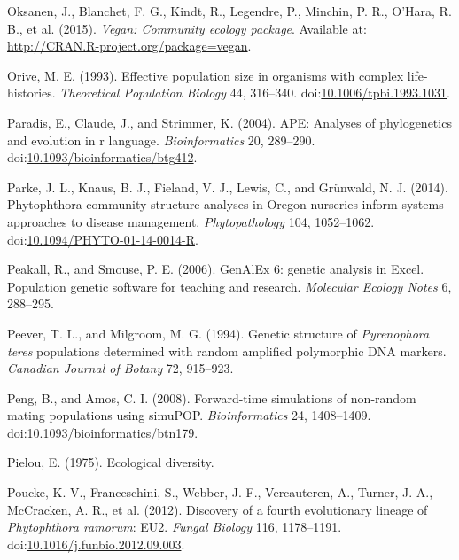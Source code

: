 \documentclass[double,12pt]{beavtex}
\begin{document}
  \hypertarget{ref-oksanen2015vegan}{}
  Oksanen, J., Blanchet, F. G., Kindt, R., Legendre, P., Minchin, P. R.,
  O'Hara, R. B., et al. (2015). \emph{Vegan: Community ecology package}.
  Available at: \url{http://CRAN.R-project.org/package=vegan}.
  
  \hypertarget{ref-orive1993effective}{}
  Orive, M. E. (1993). Effective population size in organisms with complex
  life-histories. \emph{Theoretical Population Biology} 44, 316--340.
  doi:\href{https://doi.org/10.1006/tpbi.1993.1031}{10.1006/tpbi.1993.1031}.
  
  \hypertarget{ref-paradis2004ape}{}
  Paradis, E., Claude, J., and Strimmer, K. (2004). APE: Analyses of
  phylogenetics and evolution in r language. \emph{Bioinformatics} 20,
  289--290.
  doi:\href{https://doi.org/10.1093/bioinformatics/btg412}{10.1093/bioinformatics/btg412}.
  
  \hypertarget{ref-parke2014phytophthora}{}
  Parke, J. L., Knaus, B. J., Fieland, V. J., Lewis, C., and Grünwald, N.
  J. (2014). Phytophthora community structure analyses in Oregon nurseries
  inform systems approaches to disease management. \emph{Phytopathology}
  104, 1052--1062.
  doi:\href{https://doi.org/10.1094/PHYTO-01-14-0014-R}{10.1094/PHYTO-01-14-0014-R}.
  
  \hypertarget{ref-Peakall:2006}{}
  Peakall, R., and Smouse, P. E. (2006). GenAlEx 6: genetic analysis in
  Excel. Population genetic software for teaching and research.
  \emph{Molecular Ecology Notes} 6, 288--295.
  
  \hypertarget{ref-peever1994genetic}{}
  Peever, T. L., and Milgroom, M. G. (1994). Genetic structure of
  \emph{Pyrenophora teres} populations determined with random amplified
  polymorphic DNA markers. \emph{Canadian Journal of Botany} 72, 915--923.
  
  \hypertarget{ref-peng2008forward}{}
  Peng, B., and Amos, C. I. (2008). Forward-time simulations of non-random
  mating populations using simuPOP. \emph{Bioinformatics} 24, 1408--1409.
  doi:\href{https://doi.org/10.1093/bioinformatics/btn179}{10.1093/bioinformatics/btn179}.
  
  \hypertarget{ref-pielou1975ecological}{}
  Pielou, E. (1975). Ecological diversity.
  
  \hypertarget{ref-vanpoucke2012discovery}{}
  Poucke, K. V., Franceschini, S., Webber, J. F., Vercauteren, A., Turner,
  J. A., McCracken, A. R., et al. (2012). Discovery of a fourth
  evolutionary lineage of \emph{Phytophthora ramorum}: EU2. \emph{Fungal
  Biology} 116, 1178--1191.
  doi:\href{https://doi.org/10.1016/j.funbio.2012.09.003}{10.1016/j.funbio.2012.09.003}.
  
\end{document}
